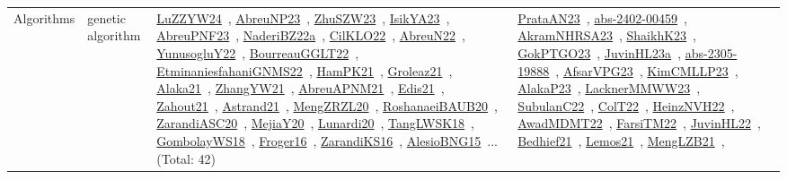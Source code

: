 {\begin{longtable}{lp{3cm}>{\raggedright\arraybackslash}p{6cm}>{\raggedright\arraybackslash}p{6cm}>{\raggedright\arraybackslash}p{8cm}}
\index{genetic algorithm}\index{Algorithms!genetic algorithm}Algorithms & genetic algorithm & \href{../works/LuZZYW24.pdf}{LuZZYW24}~\cite{LuZZYW24}, \href{../works/AbreuNP23.pdf}{AbreuNP23}~\cite{AbreuNP23}, \href{../works/ZhuSZW23.pdf}{ZhuSZW23}~\cite{ZhuSZW23}, \href{../works/IsikYA23.pdf}{IsikYA23}~\cite{IsikYA23}, \href{../works/AbreuPNF23.pdf}{AbreuPNF23}~\cite{AbreuPNF23}, \href{../works/NaderiBZ22a.pdf}{NaderiBZ22a}~\cite{NaderiBZ22a}, \href{../works/CilKLO22.pdf}{CilKLO22}~\cite{CilKLO22}, \href{../works/AbreuN22.pdf}{AbreuN22}~\cite{AbreuN22}, \href{../works/YunusogluY22.pdf}{YunusogluY22}~\cite{YunusogluY22}, \href{../works/BourreauGGLT22.pdf}{BourreauGGLT22}~\cite{BourreauGGLT22}, \href{../works/EtminaniesfahaniGNMS22.pdf}{EtminaniesfahaniGNMS22}~\cite{EtminaniesfahaniGNMS22}, \href{../works/HamPK21.pdf}{HamPK21}~\cite{HamPK21}, \href{../works/Groleaz21.pdf}{Groleaz21}~\cite{Groleaz21}, \href{../works/Alaka21.pdf}{Alaka21}~\cite{Alaka21}, \href{../works/ZhangYW21.pdf}{ZhangYW21}~\cite{ZhangYW21}, \href{../works/AbreuAPNM21.pdf}{AbreuAPNM21}~\cite{AbreuAPNM21}, \href{../works/Edis21.pdf}{Edis21}~\cite{Edis21}, \href{../works/Zahout21.pdf}{Zahout21}~\cite{Zahout21}, \href{../works/Astrand21.pdf}{Astrand21}~\cite{Astrand21}, \href{../works/MengZRZL20.pdf}{MengZRZL20}~\cite{MengZRZL20}, \href{../works/RoshanaeiBAUB20.pdf}{RoshanaeiBAUB20}~\cite{RoshanaeiBAUB20}, \href{../works/ZarandiASC20.pdf}{ZarandiASC20}~\cite{ZarandiASC20}, \href{../works/MejiaY20.pdf}{MejiaY20}~\cite{MejiaY20}, \href{../works/Lunardi20.pdf}{Lunardi20}~\cite{Lunardi20}, \href{../works/TangLWSK18.pdf}{TangLWSK18}~\cite{TangLWSK18}, \href{../works/GombolayWS18.pdf}{GombolayWS18}~\cite{GombolayWS18}, \href{../works/Froger16.pdf}{Froger16}~\cite{Froger16}, \href{../works/ZarandiKS16.pdf}{ZarandiKS16}~\cite{ZarandiKS16}, \href{../works/AlesioBNG15.pdf}{AlesioBNG15}~\cite{AlesioBNG15}... (Total: 42) & \href{../works/PrataAN23.pdf}{PrataAN23}~\cite{PrataAN23}, \href{../works/abs-2402-00459.pdf}{abs-2402-00459}~\cite{abs-2402-00459}, \href{../works/AkramNHRSA23.pdf}{AkramNHRSA23}~\cite{AkramNHRSA23}, \href{../works/ShaikhK23.pdf}{ShaikhK23}~\cite{ShaikhK23}, \href{../works/GokPTGO23.pdf}{GokPTGO23}~\cite{GokPTGO23}, \href{../works/JuvinHL23a.pdf}{JuvinHL23a}~\cite{JuvinHL23a}, \href{../works/abs-2305-19888.pdf}{abs-2305-19888}~\cite{abs-2305-19888}, \href{../works/AfsarVPG23.pdf}{AfsarVPG23}~\cite{AfsarVPG23}, \href{../works/KimCMLLP23.pdf}{KimCMLLP23}~\cite{KimCMLLP23}, \href{../works/AlakaP23.pdf}{AlakaP23}~\cite{AlakaP23}, \href{../works/LacknerMMWW23.pdf}{LacknerMMWW23}~\cite{LacknerMMWW23}, \href{../works/SubulanC22.pdf}{SubulanC22}~\cite{SubulanC22}, \href{../works/ColT22.pdf}{ColT22}~\cite{ColT22}, \href{../works/HeinzNVH22.pdf}{HeinzNVH22}~\cite{HeinzNVH22}, \href{../works/AwadMDMT22.pdf}{AwadMDMT22}~\cite{AwadMDMT22}, \href{../works/FarsiTM22.pdf}{FarsiTM22}~\cite{FarsiTM22}, \href{../works/JuvinHL22.pdf}{JuvinHL22}~\cite{JuvinHL22}, \href{../works/Bedhief21.pdf}{Bedhief21}~\cite{Bedhief21}, \href{../works/Lemos21.pdf}{Lemos21}~\cite{Lemos21}, \href{../works/MengLZB21.pdf}{MengLZB21}~\cite{MengLZB21}, 
\end{longtable}}
